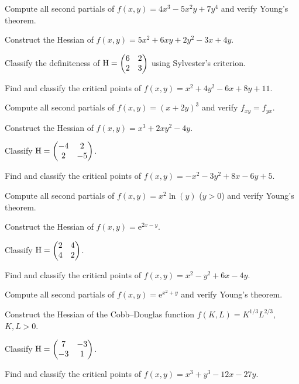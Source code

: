 \begin{problems}
  \item Compute all second partials of $f(x,y) = 4x^{3} - 5x^{2}y + 7y^{4}$
        and verify Young's theorem.
  \item Construct the Hessian of
        $f(x,y) = 5x^{2} + 6xy + 2y^{2} - 3x + 4y$.
  \item Classify the definiteness of
        $\operatorname{H} = \begin{pmatrix}6&2\\2&3\end{pmatrix}$ using Sylvester's
        criterion.
  \item Find and classify the critical points of
        $f(x,y) = x^{2} + 4y^{2} - 6x + 8y + 11$.
  \item Compute all second partials of $f(x,y) = (x+2y)^{3}$ and verify
        $f_{xy} = f_{yx}$.
  \item Construct the Hessian of $f(x,y) = x^{3} + 2xy^{2} - 4y$.
  \item Classify $\operatorname{H} = \begin{pmatrix}-4&2\\2&-5\end{pmatrix}$.
  \item Find and classify the critical points of
        $f(x,y) = -x^{2} - 3y^{2} + 8x - 6y + 5$.
  \item Compute all second partials of $f(x,y) = x^{2}\ln(y)$ ($y>0$) and
        verify Young's theorem.
  \item Construct the Hessian of $f(x,y) = \mathrm{e}^{2x-y}$.
  \item Classify $\operatorname{H} = \begin{pmatrix}2&4\\4&2\end{pmatrix}$.
  \item Find and classify the critical points of
        $f(x,y) = x^{2} - y^{2} + 6x - 4y$.
  \item Compute all second partials of $f(x,y) = \mathrm{e}^{x^{2}+y}$ and
        verify Young's theorem.
  \item Construct the Hessian of the Cobb--Douglas function
        $f(K,L) = K^{1/3}L^{2/3}$, $K,L>0$.
  \item Classify $\operatorname{H} = \begin{pmatrix}7&-3\\-3&1\end{pmatrix}$.
  \item Find and classify the critical points of
        $f(x,y) = x^{3} + y^{3} - 12x - 27y$.

\end{problems}
